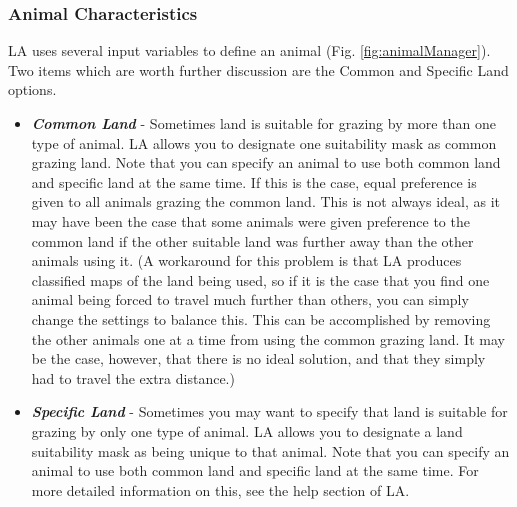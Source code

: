     \subsubsection{Animal Characteristics}
      LA uses several input variables  to define an animal (Fig.
      \ref{fig:animalManager}).  Two items which are worth further discussion
      are the Common and Specific Land options.
      \begin{itemize}
        \item \textit{\textbf{Common Land}} - Sometimes land is suitable for
          grazing by more than one type of animal. LA allows you to
          designate one suitability mask as common grazing land. Note that you
          can specify an animal to use both common land and specific land at the
          same time. If this is the case, equal preference is given to all
          animals grazing the common land. This is not always ideal, as it may
          have been the case that some animals were given preference to the
          common land if the other suitable land was further away than the other
          animals using it.  (A workaround for this problem is that LA
          produces classified maps of the land being used, so if it is
          the case that you find one animal being forced to travel much further
          than others, you can simply change the settings to balance this. This
          can be accomplished by removing the other animals one at a time from
          using the common grazing land. It may be the case, however, that there is no
          ideal solution, and that they simply had to travel the extra
          distance.)
        \item \textit{\textbf{Specific Land}} - Sometimes you may want to
          specify that land is suitable for grazing by only one type of animal.
          LA allows you to designate a land suitability mask as
          being unique to that animal.  Note that you can specify an animal to
          use both common land and specific land at the same time. For more
          detailed information on this, see the help section of LA.
      \end{itemize}
